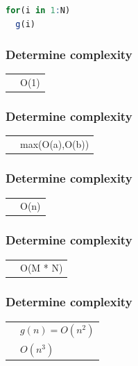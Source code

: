\documentclass{beamer}
\begin{document}
\newsavebox{\listboxV}

\begin{lrbox}{\listboxV}	
	\begin{lstlisting}[language=R,basicstyle=\ttfamily,keywordstyle=\color{black}]
for(i in 1:N)
  g(i)
\end{lstlisting}
\end{lrbox}

\begin{frame}
	\frametitle{Determine complexity}
	\begin{centering}
		\begin{tabular}{p{4.5cm} p{4.5cm}}
			\usebox{\listboxI} & O(1) \\
		\end{tabular}
	\end{centering} 
\end{frame}

\begin{frame}
	\frametitle{Determine complexity}
	\begin{centering}
	\begin{tabular}{p{4.5cm} p{4.5cm}}
		\usebox{\listboxII} & max(O(a),O(b)) \\
	\end{tabular} 
	\end{centering} 
\end{frame}


\begin{frame}
	\frametitle{Determine complexity}
	\begin{centering}
	\begin{tabular}{p{4.5cm} p{4.5cm}}
		\usebox{\listboxIII} & O(n) \\
	\end{tabular} 
	\end{centering} 
\end{frame}

\begin{frame}
	\frametitle{Determine complexity}
	\begin{centering}
		\begin{tabular}{p{4.5cm} p{4.5cm}}
			\usebox{\listboxIV} & O(M * N) \\
		\end{tabular} 
	\end{centering} 
\end{frame}

\begin{frame}
	\frametitle{Determine complexity}
	\begin{centering}
		\begin{tabular}{p{4.5cm} p{4.5cm}}
			& $g(n) = O(n^2)$ \\
			\usebox{\listboxV} & $O(n^3)$ \\
		\end{tabular} 
	\end{centering} 
\end{frame}
\end{document}
